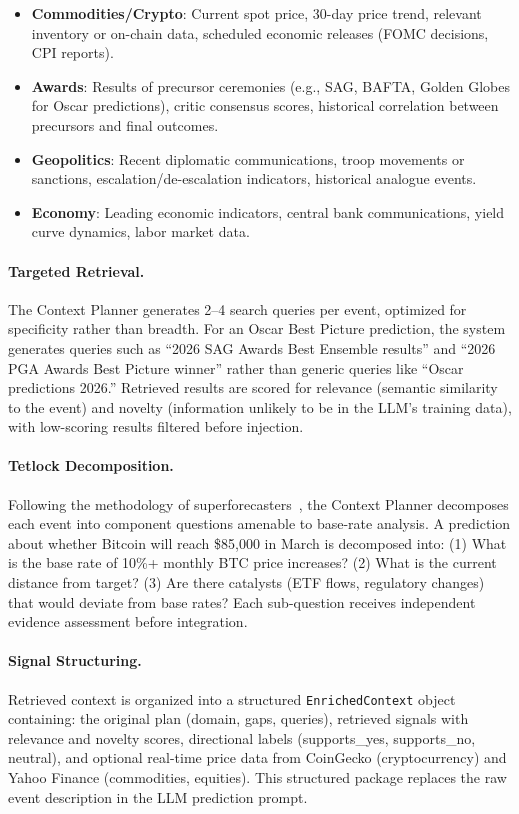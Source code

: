 \begin{itemize}
    \item \textbf{Commodities/Crypto}: Current spot price, 30-day price trend, relevant inventory or on-chain data, scheduled economic releases (FOMC decisions, CPI reports).
    \item \textbf{Awards}: Results of precursor ceremonies (e.g., SAG, BAFTA, Golden Globes for Oscar predictions), critic consensus scores, historical correlation between precursors and final outcomes.
    \item \textbf{Geopolitics}: Recent diplomatic communications, troop movements or sanctions, escalation/de-escalation indicators, historical analogue events.
    \item \textbf{Economy}: Leading economic indicators, central bank communications, yield curve dynamics, labor market data.
\end{itemize}

\paragraph{Targeted Retrieval.} The Context Planner generates 2--4 search queries per event, optimized for specificity rather than breadth. For an Oscar Best Picture prediction, the system generates queries such as ``2026 SAG Awards Best Ensemble results'' and ``2026 PGA Awards Best Picture winner'' rather than generic queries like ``Oscar predictions 2026.'' Retrieved results are scored for relevance (semantic similarity to the event) and novelty (information unlikely to be in the LLM's training data), with low-scoring results filtered before injection.

\paragraph{Tetlock Decomposition.} Following the methodology of superforecasters~\cite{tetlock2015superforecasting}, the Context Planner decomposes each event into component questions amenable to base-rate analysis. A prediction about whether Bitcoin will reach \$85{,}000 in March is decomposed into: (1) What is the base rate of 10\%+ monthly BTC price increases? (2) What is the current distance from target? (3) Are there catalysts (ETF flows, regulatory changes) that would deviate from base rates? Each sub-question receives independent evidence assessment before integration.

\paragraph{Signal Structuring.} Retrieved context is organized into a structured \texttt{EnrichedContext} object containing: the original plan (domain, gaps, queries), retrieved signals with relevance and novelty scores, directional labels (supports\_yes, supports\_no, neutral), and optional real-time price data from CoinGecko (cryptocurrency) and Yahoo Finance (commodities, equities). This structured package replaces the raw event description in the LLM prediction prompt.

